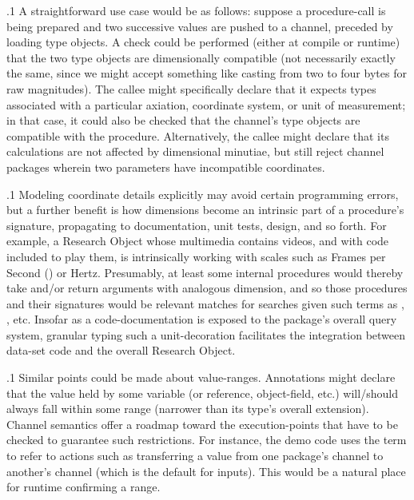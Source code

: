 \documentclass[11pt, twocolumn]{article}
\begin{document}
\p.1{%
A straightforward use case would be as follows:
suppose a procedure-call is being prepared and two
successive values are pushed to a channel, preceded
by loading type objects. A check could be
performed (either at compile or runtime) that
the two type objects are dimensionally compatible
(not necessarily exactly the same, since we might
accept something like casting from two to four
bytes for raw magnitudes). The callee might specifically
declare that it expects types associated with a
particular axiation, coordinate system, or unit
of measurement; in that
case, it could also be checked that the channel's type
objects are compatible with the procedure. Alternatively,
the callee might declare that its calculations are not
affected by dimensional minutiae, but still reject channel
packages wherein two parameters have incompatible coordinates.
}%

\p.1{%
Modeling coordinate details explicitly may
avoid certain programming errors, but a further benefit
is how dimensions become an intrinsic part of a
procedure's signature, propagating to documentation,
unit tests,  design, and so forth. For example,
a Research Object whose multimedia contains videos,
and with code included to play them, is intrinsically
working with scales such as Frames per Second ()
or Hertz. Presumably, at least some internal
procedures would thereby take and/or return
arguments with analogous dimension, and so those
procedures and their signatures would be relevant
matches for searches given such terms as ,
, etc. Insofar as a code-documentation 
is exposed to the package's overall query system,
granular typing such a unit-decoration facilitates the
integration between data-set code and the overall Research Object.
}%

\p.1{%
Similar points could be made about value-ranges. Annotations
might declare that the value held by some variable
(or reference, object-field, etc.) will/should always
fall within some range (narrower than its type's
overall extension). Channel semantics offer a roadmap
toward the execution-points that have to be checked to
guarantee such restrictions. For instance, the demo code
uses the term  to refer to
actions such as transferring a value from one package's
 channel to another's  channel
(which is the default for inputs). This would be a natural
place for runtime  confirming a range.
}%
\end{document}
